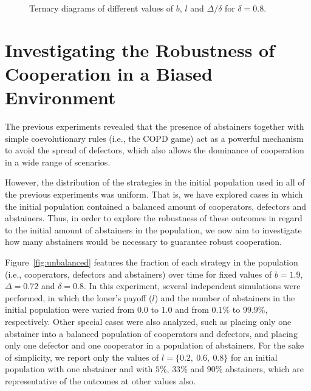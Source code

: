 \documentclass{llncs}
\begin{document}
\begin{figure}[tb]
    \centering
    {}
    {}
    {}
    \caption{
        Ternary diagrams of different values of $b$, $l$ and $\Delta/\delta$
        for $\delta=0.8$.
    }
    \label{fig:ternary}
\end{figure}


\section{Investigating the Robustness of Cooperation in a Biased Environment}
\label{sec:results3}

The previous experiments revealed that the presence of abstainers together with
simple coevolutionary rules (i.e., the COPD game) act as a powerful mechanism to
avoid the spread of defectors, which also allows the dominance of cooperation
in a wide range of scenarios.

However, the distribution of the strategies in the initial population used in
all of the previous experiments was uniform. That is, we have explored cases in which
the initial population contained a balanced amount of cooperators, defectors and
abstainers. Thus, in order to explore the robustness of these outcomes in
regard to the initial amount of abstainers in the population, we now aim to
investigate how many abstainers would be necessary to guarantee robust
cooperation.

Figure~\ref{fig:unbalanced} features the fraction of each strategy in the
population (i.e., cooperators, defectors and abstainers) over time for fixed
values of $b=1.9$, $\Delta=0.72$ and $\delta=0.8$. In this experiment, several
independent simulations were performed, in which the loner’s payoff ($l$) and the
number of abstainers in the initial population were varied from $0.0$ to $1.0$
and from $0.1\%$ to $99.9\%$, respectively. Other special cases were also
analyzed, such as placing only one abstainer into a balanced population of
cooperators and defectors, and placing only one defector and one cooperator in
a population of abstainers. For the sake of simplicity, we report only the
values of $l=\{0.2,\ 0.6,\ 0.8\}$ for an initial population with one abstainer
and with $5\%$, $33\%$ and $90\%$ abstainers, which are representative of the
outcomes at other values also.
\end{document}
